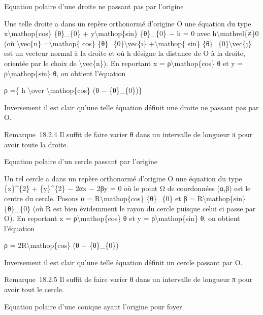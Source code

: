 \documentclass[]{article}
\begin{document}
Equation polaire d'une droite ne passant pas par l'origine

Une telle droite a dans un repère orthonormé d'origine O une équation du
type x\textbackslash{}mathop\{cos\} \{θ\}\_\{0\} +
y\textbackslash{}mathop\{sin\} \{θ\}\_\{0\} − h = 0 avec
h\textbackslash{}mathrel\{≠\}0 (où \textbackslash{}vec\{n\}
=\textbackslash{}mathop\{ cos\} \{θ\}\_\{0\}\textbackslash{}vec\{ı\}
+\textbackslash{}mathop\{ sin\} \{θ\}\_\{0\}\textbackslash{}vec\{ȷ\} est
un vecteur normal à la droite et où h désigne la distance de O à la
droite, orientée par le choix de \textbackslash{}vec\{n\}). En reportant
x = ρ\textbackslash{}mathop\{cos\} θ et y =
ρ\textbackslash{}mathop\{sin\} θ, on obtient l'équation

ρ =\{ h \textbackslash{}over \textbackslash{}mathop\{cos\} (θ −
\{θ\}\_\{0\})\}

Inversement il est clair qu'une telle équation définit une droite ne
passant pas par O.

Remarque~18.2.4 Il suffit de faire varier θ dans un intervalle de
longueur π pour avoir toute la droite.

Equation polaire d'un cercle passant par l'origine

Un tel cercle a dans un repère orthonormé d'origine O une équation du
type \{x\}\^{}\{2\} + \{y\}\^{}\{2\} − 2αx − 2βy = 0 où le point Ω de
coordonnées (α,β) est le centre du cercle. Posons α =
R\textbackslash{}mathop\{cos\} \{θ\}\_\{0\} et β =
R\textbackslash{}mathop\{sin\} \{θ\}\_\{0\} (où R est bien évidemment le
rayon du cercle puisque celui ci passe par O). En reportant x =
ρ\textbackslash{}mathop\{cos\} θ et y = ρ\textbackslash{}mathop\{sin\}
θ, on obtient l'équation

ρ = 2R\textbackslash{}mathop\{cos\} (θ − \{θ\}\_\{0\})

Inversement il est clair qu'une telle équation définit un cercle passant
par O.

Remarque~18.2.5 Il suffit de faire varier θ dans un intervalle de
longueur π pour avoir tout le cercle.

Equation polaire d'une conique ayant l'origine pour foyer
\end{document}
